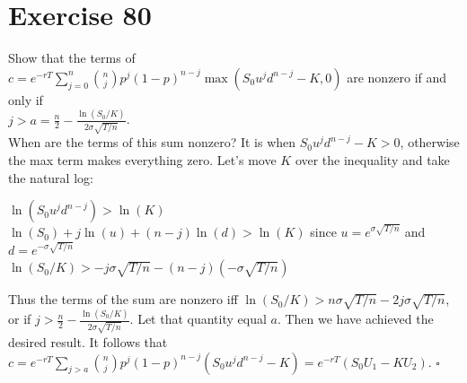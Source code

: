 \documentclass{article}
\begin{document}
\section*{Exercise 80}
\begin{flushleft}
    Show that the terms of $c = e^{-rT} \sum_{j=0}^{n} \binom{n}{j} p^j (1-p)^{n-j} \max{(S_0u^jd^{n-j} - K, 0)}$ are nonzero if and only if \\
    $j>a = \frac{n}{2} - \frac{\ln(S_0 / K)}{2\sigma \sqrt{T/n}}$. \\
    When are the terms of this sum nonzero? It is when $S_0u^jd^{n-j} - K >0$, otherwise the max term makes everything zero. Let's move $K$ over the inequality and take the natural log: \\
    \begin{center}
        $\ln(S_0u^jd^{n-j}) > \ln(K)$ \\
        $\ln(S_0) + j\ln(u) + (n-j)\ln(d) > \ln(K)$ since $u = e^{\sigma \sqrt{T/n}}$ and $d = e^{-\sigma \sqrt{T/n}}$ \\
        $\ln(S_0 /K) > -j\sigma \sqrt{T/n} - (n-j)(- \sigma \sqrt{T/n})$
    \end{center}
    Thus the terms of the sum are nonzero iff $\ln(S_0/K) > n\sigma \sqrt{T/n} - 2j\sigma \sqrt{T/n}$, or if $j > \frac{n}{2} - \frac{\ln(S_0/K)}{2\sigma \sqrt{T/n}}$. Let that quantity equal $a$.
    Then we have achieved the desired result. It follows that $c = e^{-rT} \sum_{j>a}^{} \binom{n}{j} p^j (1-p)^{n-j} (S_0u^jd^{n-j} - K) = e^{-rT}(S_0U_1 - KU_2)$. $\square$
\end{flushleft}
\end{document}
